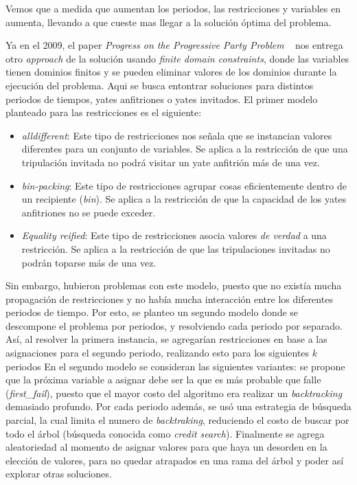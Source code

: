 \documentclass[letter, 10pt]{article}
\begin{document}
Vemos que a medida que aumentan los periodos, las restricciones y variables en aumenta, llevando a que cueste mas llegar a la solución óptima del problema.

Ya en el 2009, el paper \textit{Progress on the Progressive Party Problem} ~\cite{Simonis2009} nos entrega otro \textit{approach} de la solución usando \textit{finite domain constraints}, donde las variables tienen dominios finitos y se pueden eliminar
valores de los dominios durante la ejecución del problema. Aqui se busca entontrar soluciones para distintos periodos de tiempos, yates anfitriones o yates invitados. El primer modelo planteado para las restricciones es el siguiente:

\begin{itemize}
    \item \textit{alldifferent}: Este tipo de restricciones nos señala que se instancian valores diferentes para un conjunto de variables. Se aplica a la restricción de que una tripulación invitada no podrá visitar un yate anfitrión más de una vez.
    \item \textit{bin-packing}: Este tipo de restricciones agrupar cosas eficientemente dentro de un recipiente (\textit{bin}). Se aplica a la restricción de que la capacidad de los yates anfitriones no se puede exceder.
    \item \textit{Equality reified}: Este tipo de restricciones asocia valores \textit{de verdad} a una restricción. Se aplica a la restricción de que las tripulaciones invitadas no podrán toparse más de una vez.
\end{itemize}
Sin embargo, hubieron problemas con este modelo, puesto que no existía mucha propagación de restricciones y no había mucha interacción entre los diferentes periodos de tiempo. Por esto, se planteo un segundo modelo donde se descompone el problema por periodos, y resolviendo cada periodo por separado. Así, al resolver la primera instancia, se agregarían restricciones en base a las asignaciones para el segundo periodo, realizando esto para los siguientes $k$ periodos En el segundo modelo se consideran las siguientes variantes: se propone que la próxima variable a asignar debe ser la que es más probable que falle (\textit{first\_fail}), puesto que el mayor costo del algoritmo era realizar un \textit{backtracking} demasiado profundo. Por cada periodo además, se usó una estrategia de búsqueda parcial, la cual limita el numero de \textit{backtraking}, reduciendo el costo de buscar por todo el árbol (búsqueda conocida como \textit{credit search}). Finalmente se agrega aleatoriedad al momento de asignar valores para que haya un desorden en la elección de valores, para no quedar atrapados en una rama del árbol y poder así explorar otras soluciones.
\end{document}
